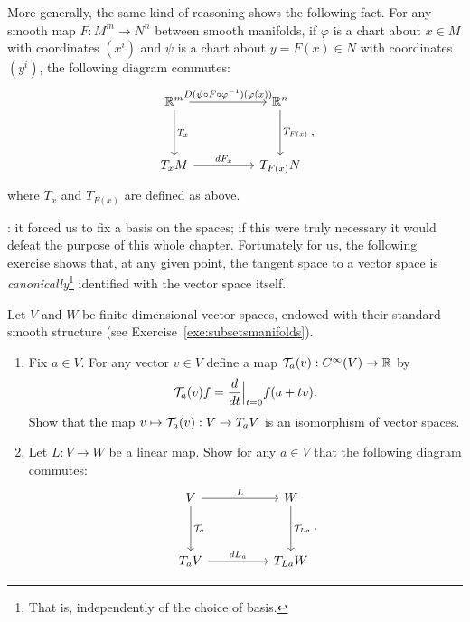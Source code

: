 More generally, the same kind of reasoning shows the following fact. For any smooth map $F:M^m \to N^n$ between smooth manifolds, if $\varphi$ is a chart about $x\in M$ with coordinates $(x^i)$ and $\psi$ is a chart about $y=F(x)\in N$ with coordinates $(y^i)$, the following diagram commutes:
\begin{equation}
	\begin{tikzcd}[row sep=huge, column sep=huge]
		\R^m \arrow[r, "D(\psi \circ F \circ \varphi^{-1})(\varphi(x))"] \arrow[d, "T_x"]
		& \R^n \arrow[d, "T_{F(x)}"] \\
		T_xM \arrow[r, "dF_x"]
		& T_{F(x)}N
	\end{tikzcd},
\end{equation}
where $T_x$ and $T_{F(x)}$ are defined as above.

: it forced us to fix a basis on the spaces; if this were truly necessary it would defeat the purpose of this whole chapter.
Fortunately for us, the following exercise shows that, at any given point, the tangent space to a vector space is \emph{canonically}\footnote{That is, independently of the choice of basis.} identified with the vector space itself.

\begin{exercise}\label{ex:tg_curve_iso}
	Let $V$ and $W$ be finite-dimensional vector spaces, endowed with their standard smooth structure (see Exercise~\ref{exe:subsetsmanifolds}).
	\begin{enumerate}
		\item Fix $a\in V$. For any vector $v\in V$ define a map $\mathcal{T}_a(v) : C^\infty(V) \to \mathbb{R}$ by
		      \begin{equation}
			      \mathcal{T}_a(v) f = \frac{d}{dt}\Big|_{t=0} f(a + tv).
		      \end{equation}
		      Show that the map $v\mapsto \mathcal{T}_a(v) : V \to T_aV$ is an isomorphism of vector spaces.
		\item Let $L:V\to W$ be a linear map. Show for any $a\in V$ that the following diagram commutes:
		      \begin{equation}
			      \begin{tikzcd}[row sep=huge, column sep=huge]
				      V \arrow[r, "L"] \arrow[d, "\cT_a"]
				      & W \arrow[d, "\cT_{La}"] \\
				      T_aV \arrow[r, "dL_a"]
				      & T_{La}W
			      \end{tikzcd}.
		      \end{equation}
	\end{enumerate}
\end{exercise}

